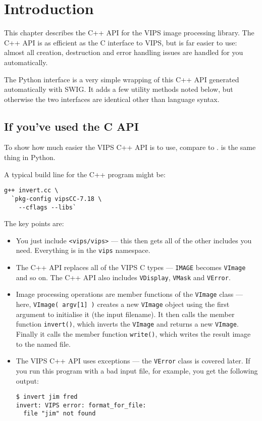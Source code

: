\section{Introduction}

This chapter describes the C++ API for the VIPS image processing library.
The C++ API is as efficient as the C interface to VIPS, but is
far easier to use: almost all creation, destruction and error handling issues
are handled for you automatically.

The Python interface is a very simple wrapping of this C++ API generated
automatically with SWIG. It adds a few utility methods noted below, but
otherwise the two interfaces are identical other than language
syntax.

\subsection{If you've used the C API}

To show how much easier the VIPS C++ API is to use, compare 
to .  is the same thing in Python.

A typical build line for the C++ program might be:

\begin{verbatim}
g++ invert.cc \
  `pkg-config vipsCC-7.18 \
    --cflags --libs` 
\end{verbatim}

The key points are:

\begin{itemize}

\item
You just include \verb+<vips/vips>+ --- this then gets all of the
other includes you need. Everything is in the \verb+vips+ namespace.

\item
The C++ API replaces all of the VIPS C types --- \verb+IMAGE+ becomes
\verb+VImage+ and so on. The C++ API also includes \verb+VDisplay+,
\verb+VMask+ and \verb+VError+.

\item
Image processing operations are member functions of the \verb+VImage+ class
--- here, \verb+VImage( argv[1] )+ creates a new \verb+VImage+ object using
the first argument to initialise it (the input filename). It then calls the
member function \verb+invert()+, which inverts the \verb+VImage+ and returns a
new \verb+VImage+.  Finally it calls the member function \verb+write()+, which
writes the result image to the named file.

\item
The VIPS C++ API uses exceptions --- the \verb+VError+ class is covered
later. If you run this program with a bad input file, for example, you get the
following output:

\begin{verbatim}
$ invert jim fred
invert: VIPS error: format_for_file: 
  file "jim" not found
\end{verbatim}

\end{itemize}

